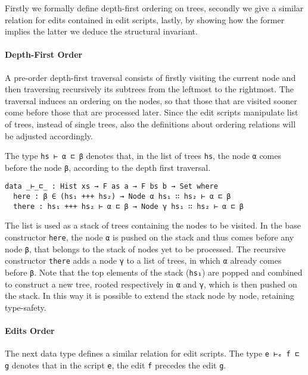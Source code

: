 \documentclass[preprint]{sigplanconf}
\begin{document}
    Firstly we formally define depth-first ordering on trees, secondly
    we give a similar relation for edits contained in edit scripts, 
    lastly, by showing how the former implies the latter we deduce
    the structural invariant.
    

    \paragraph{Depth-First Order}
    A pre-order depth-first traversal consists of firstly visiting the current node 
    and then traversing recursively its subtrees from the leftmost to the rightmost.
    The traversal induces an ordering on the nodes, so that those that
    are visited sooner come before those that are processed later.
    Since the edit scripts manipulate list of trees, instead of single trees,
    also the definitions about ordering relations will be adjusted accordingly.

    The type \texttt{hs ⊢ α ⊏ β} denotes that, in the list of trees \texttt{hs}, 
    the node \texttt{α} comes before the node \texttt{β}, according to the
    depth first traversal.

\begin{verbatim}
data _⊢_⊏_ : Hist xs → F as a → F bs b → Set where
  here : β ∈ (hs₁ +++ hs₂) → Node α hs₁ ∷ hs₂ ⊢ α ⊏ β
  there : hs₁ +++ hs₂ ⊢ α ⊏ β → Node γ hs₁ ∷ hs₂ ⊢ α ⊏ β
\end{verbatim}

    The list is used as a stack of trees containing the nodes to be visited.
    In the base constructor \texttt{here}, the node \texttt{α} is pushed on the 
    stack and thus comes before any node \texttt{β}, that belongs to the
    stack of nodes yet to be processed.
    The recursive constructor \texttt{there} adds a node \texttt{γ} to a list of 
    trees, in which \texttt{α} already comes before \texttt{β}.
    Note that the top elements of the stack (\texttt{hs₁}) are popped 
    and combined to construct a new tree, rooted respectively 
    in \texttt{α} and \texttt{γ}, which is then pushed on the stack. 
    In this way it is possible to extend the stack node by node, 
    retaining type-safety. 

    \paragraph{Edits Order}
    The next data type defines a similar relation for edit scripts.
    The type \texttt{e ⊢ₑ f ⊏ g} denotes that in the script \texttt{e}, the edit
    \texttt{f} precedes the edit \texttt{g}.
\end{document}

